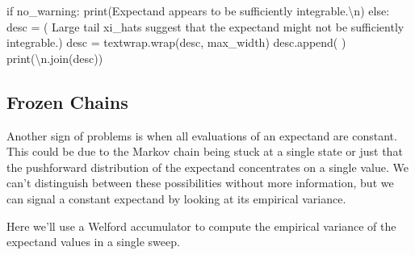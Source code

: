 \documentclass[
  letterpaper,
  DIV=11,
  numbers=noendperiod]{scrartcl}
\newenvironment{Shaded}{\begin{snugshade}}{\end{snugshade}}
\newcommand{\BuiltInTok}[1]{\textcolor[rgb]{0.00,0.23,0.31}{#1}}
\newcommand{\CharTok}[1]{\textcolor[rgb]{0.13,0.47,0.30}{#1}}
\newcommand{\ControlFlowTok}[1]{\textcolor[rgb]{0.00,0.23,0.31}{#1}}
\newcommand{\NormalTok}[1]{\textcolor[rgb]{0.00,0.23,0.31}{#1}}
\newcommand{\OperatorTok}[1]{\textcolor[rgb]{0.37,0.37,0.37}{#1}}
\newcommand{\StringTok}[1]{\textcolor[rgb]{0.13,0.47,0.30}{#1}}
\begin{document}
\begin{Shaded}
\begin{Highlighting}[]
  \ControlFlowTok{if}\NormalTok{ no\_warning:}
    \BuiltInTok{print}\NormalTok{(}\StringTok{\textquotesingle{}Expectand appears to be sufficiently integrable.}\CharTok{\textbackslash{}n}\StringTok{\textquotesingle{}}\NormalTok{)}
  \ControlFlowTok{else}\NormalTok{:}
\NormalTok{    desc }\OperatorTok{=}\NormalTok{ (}\StringTok{\textquotesingle{}  Large tail xi\_hats suggest that the expectand might\textquotesingle{}}
            \StringTok{\textquotesingle{}not be sufficiently integrable.\textquotesingle{}}\NormalTok{)}
\NormalTok{    desc }\OperatorTok{=}\NormalTok{ textwrap.wrap(desc, max\_width)}
\NormalTok{    desc.append(}\StringTok{\textquotesingle{} \textquotesingle{}}\NormalTok{)}
    \BuiltInTok{print}\NormalTok{(}\StringTok{\textquotesingle{}}\CharTok{\textbackslash{}n}\StringTok{\textquotesingle{}}\NormalTok{.join(desc))}
\end{Highlighting}
\end{Shaded}

\hypertarget{frozen-chains}{%
\subsection{Frozen Chains}\label{frozen-chains}}

Another sign of problems is when all evaluations of an expectand are
constant. This could be due to the Markov chain being stuck at a single
state or just that the pushforward distribution of the expectand
concentrates on a single value. We can't distinguish between these
possibilities without more information, but we can signal a constant
expectand by looking at its empirical variance.

Here we'll use a Welford accumulator to compute the empirical variance
of the expectand values in a single sweep.
\end{document}
